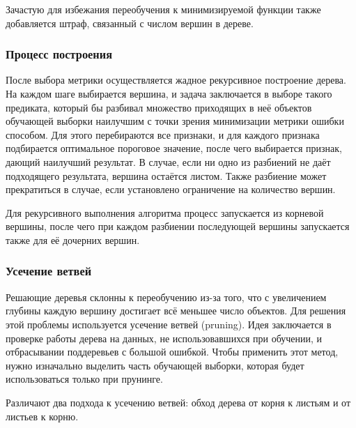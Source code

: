 Зачастую для избежания переобучения к минимизируемой функции также добавляется штраф, связанный с числом вершин в дереве.

\subsubsection{Процесс построения}
После выбора метрики осуществляется жадное рекурсивное построение дерева. На каждом шаге выбирается вершина, и задача заключается в выборе такого предиката, который бы разбивал множество приходящих в неё объектов обучающей выборки наилучшим с точки зрения минимизации метрики ошибки способом. Для этого перебираются все признаки, и для каждого признака подбирается оптимальное пороговое значение, после чего выбирается признак, дающий наилучший результат. В случае, если ни одно из разбиений не даёт подходящего результата, вершина остаётся листом. Также разбиение может прекратиться в случае, если установлено ограничение на количество вершин.

Для рекурсивного выполнения алгоритма процесс запускается из корневой вершины, после чего при каждом разбиении последующей вершины запускается также для её дочерних вершин.

\subsubsection{Усечение ветвей}

Решающие деревья склонны к переобучению из-за того, что с увеличением глубины каждую вершину достигает всё меньшее число объектов. Для решения этой проблемы используется усечение ветвей (pruning). Идея заключается в проверке работы дерева на данных, не использовавшихся при обучении, и отбрасывании поддеревьев с большой ошибкой. Чтобы применить этот метод, нужно изначально выделить часть обучающей выборки, которая будет использоваться только при прунинге.

Различают два подхода к усечению ветвей: обход дерева от корня к листьям и от листьев к корню.     

